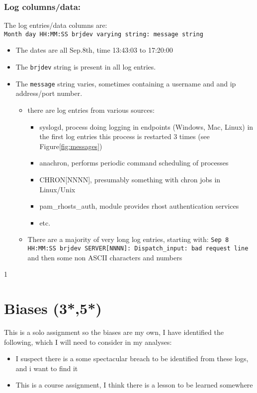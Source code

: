 \documentclass[
	letterpaper, %
	10pt, %
	unnumberedsections, %
	twoside, %
]{APAAssignment}
\begin{document}
\subsubsection{Log columns/data:} The log entries/data columns are: \\
\texttt{\textquotesingle{}Month\textquotesingle{}\ \textquotesingle{}day\textquotesingle{}\ \textquotesingle{}HH:MM:SS\textquotesingle{}\ \textquotesingle{}brjdev\textquotesingle{}\ \textquotesingle{}varying\ string\textquotesingle{}:\ \textquotesingle{}message\ string\textquotesingle{}}
\begin{itemize}
   \item The dates are all Sep.8th, time 13:43:03 to 17:20:00
   \item The \texttt{brjdev} string is present in all log entries. 
   \item The \texttt{message} string varies, sometimes containing a username and and ip address/port number.
   \begin{itemize}
	  \item there are log entries from various sources:
	  \begin{itemize}
	      \item syslogd, process doing logging in endpoints (Windows, Mac, Linux)\cite{syslog} in the first log entries this process is restarted 3 times (see Figure\ref{fig:messages})
		  \item anachron, performs periodic command scheduling of processes \cite{anacron}
		  \item CHRON[NNNN], presumably something with chron jobs in Linux/Unix
		  \item pam\_rhosts\_auth, module provides rhost authentication services\cite{pamRhostsAuth}   
		  \item etc.
	  \end{itemize}
	  \item There are a majority of very long log entries, starting with: \texttt{Sep  8 HH:MM:SS brjdev SERVER[NNNN]: Dispatch\_input: bad request line} and then some non ASCII characters and numbers
   \end{itemize}
\end{itemize}
1

\section{Biases (3*,5*)}
This is a solo assignment so the biases are my own, I have identified the following, which I will need to consider in my analyses:
\begin{itemize}
	\item I suspect there is a some spectacular breach to be identified from these logs, and i want to find it 
	\item This is a course assignment, I think there is a lesson to be learned somewhere
\end{itemize}
\end{document}
